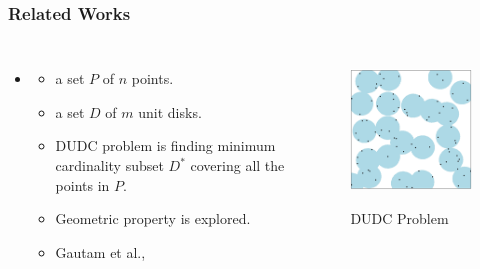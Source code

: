 \documentclass[blue]{beamer}
\begin{document}
\begin{frame}
\begin{columns}
{\begin{figure}[H]
     \end{figure}
    }
     \end{columns}
 \end{frame}
  
\begin{frame}
 \frametitle {Related Works}
 \begin{columns}
 \begin{itemize}
  \item {}
   \begin{itemize}
    \item a set $P$ of $n$ points.
    \item a set $D$ of $m$ unit disks.
    \item DUDC problem is finding minimum cardinality subset $D^{\ast}$ covering all the points in $P$.
    \item Geometric property is explored.
    \item Gautam et al.,\cite{GRALB12}
   \end{itemize}
 \end{itemize}
  \begin{figure}[H]
     \caption{DUDC Problem}
        \centering
           \scalebox{0.6}
          {\includegraphics[width=\linewidth]{cover41.png}}
     \end{figure}
     \end{columns}
\end{frame}
\end{document}
